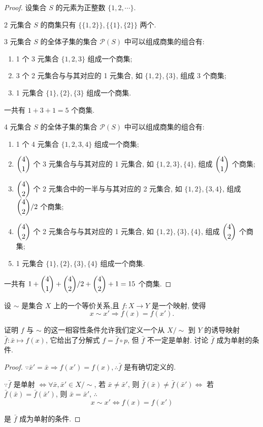 \documentclass[color=black,device=normal,lang=cn,mode=geye]{elegantnote}
\begin{document}
\begin{proof}
    设集合 $S$ 的元素为正整数 $\{1,2,\cdots\}$.

    2 元集合 $S$ 的商集只有 $\{\{1,2\}\},\{\{1\},\{2\}\}$ 两个.

    3 元集合 $S$ 的全体子集的集合 $\mathcal{P}(S)$ 中可以组成商集的组合有:
    \begin{enumerate}
        \item 1 个 3 元集合 $\{1,2,3\}$ 组成一个商集;
        \item 3 个 2 元集合与与其对应的 1 元集合, 如 $\{1,2\},\{3\}$, 组成 3 个商集;
        \item 1 元集合 $\{1\},\{2\},\{3\}$ 组成一个商集.
    \end{enumerate}

    一共有 $1+3+1=5$ 个商集.

    4 元集合 $S$ 的全体子集的集合 $\mathcal{P}(S)$ 中可以组成商集的组合有:
    \begin{enumerate}
        \item 1 个 4 元集合 $\{1,2,3,4\}$ 组成一个商集;
        \item $\dbinom{4}{1}$ 个 3 元集合与与其对应的 1 元集合, 如 $\{1,2,3\},\{4\}$, 组成 $\dbinom{4}{1}$ 个商集;
        \item $\dbinom{4}{2}$ 个 2 元集合中的一半与与其对应的 2 元集合, 如 $\{1,2\},\{3,4\}$, 组成 $\dbinom{4}{2}/2$ 个商集;
        \item $\dbinom{4}{2}$ 个 2 元集合与与其对应的 1 元集合, 如 $\{1,2\},\{3\},\{4\}$, 组成 $\dbinom{4}{2}$ 个商集;
        \item 1 元集合 $\{1\},\{2\},\{3\},\{4\}$ 组成一个商集.
    \end{enumerate}

    一共有 $1+\dbinom{4}{1}+\dbinom{4}{2}/2+\dbinom{4}{2}+1=15$ 个商集.
\end{proof}
\begin{exercise}%
    设 $\sim$ 是集合 $X$ 上的一个等价关系,且 $f:X\to Y$ 是一个映射, 使得
    \[x\sim x'\Rightarrow f(x)=f(x').\]

    证明 $f$ 与 $\sim$ 的这一相容性条件允许我们定义一个从 $X/\sim$ 到 $Y$ 的诱导映射 $\bar{f}:\bar{x}\mapsto f(x)$, 它给出了分解式 $f=\bar{f}\circ p$, 但 $\bar{f}$ 不一定是单射. 讨论 $\bar{f}$ 成为单射的条件.
\end{exercise}
\begin{proof}
    $\because\bar{x}'=\bar{x}\Rightarrow f(x')=f(x),\therefore\bar{f}$ 是有确切定义的.

    $\because\bar{f}$ 是单射 $\Leftrightarrow\forall\bar{x},\bar{x}'\in X/\sim$, 若 $\bar{x}\neq\bar{x}'$, 则 $\bar{f}(\bar{x})\neq\bar{f}(\bar{x}')\Leftrightarrow$ 若 $\bar{f}(\bar{x})=\bar{f}(\bar{x}')$, 则 $\bar{x}=\bar{x}'$, $\therefore$
    \[x\sim x'\Leftrightarrow f(x)=f(x')\]

    是 $\bar{f}$ 成为单射的条件.
\end{proof}
\end{document}
